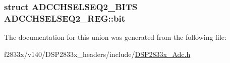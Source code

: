 \subsubsection[{bit}]{\setlength{\rightskip}{0pt plus 5cm}struct {\bf A\+D\+C\+C\+H\+S\+E\+L\+S\+E\+Q2\+\_\+\+B\+I\+T\+S} A\+D\+C\+C\+H\+S\+E\+L\+S\+E\+Q2\+\_\+\+R\+E\+G\+::bit}\label{union_a_d_c_c_h_s_e_l_s_e_q2___r_e_g_acb3e07a9ebdec865722a0c58b0c685bc}


The documentation for this union was generated from the following file\+:\begin{DoxyCompactItemize}
\item 
f2833x/v140/\+D\+S\+P2833x\+\_\+headers/include/\hyperlink{_d_s_p2833x___adc_8h}{D\+S\+P2833x\+\_\+\+Adc.\+h}\end{DoxyCompactItemize}
